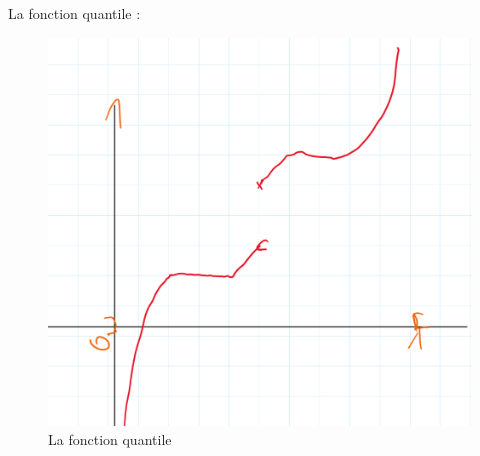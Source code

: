 \documentclass{article}
\theoremstyle{plain}%
\theoremstyle{definition}
\theoremstyle{remark}
\begin{document}
    La fonction quantile : 
    \begin{figure}[!htbp]
        \centering
        \includegraphics[width=.75\textwidth]{figures/figure4.png}
        \caption{La fonction quantile}
        \label{}
    \end{figure}
\end{document}
